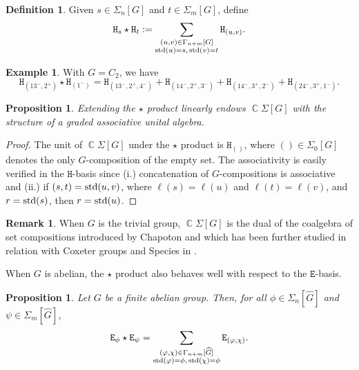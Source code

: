 \documentclass[11pt, oneside, reqno]{amsart}
\newtheorem{prop}[theorem]{Proposition}
\theoremstyle{definition}
\newtheorem{definition}[theorem]{Definition}
\newtheorem{example}[theorem]{Example}
\newtheorem{remark}[theorem]{Remark}
\numberwithin{equation}{section}
\DeclareMathOperator{\C}{\mathbb{C}}
\def \kk{\C}
\def \wh{\widehat}
\def \ztwo {{C_2}}
\newcommand{\B}[1]{\mathtt{#1}} 			%
\begin{document}
\begin{definition}\label{def:staronhsiao}
    Given $s \in \Sigma_n[G]$ and $t \in \Sigma_m[G]$, define
    \[
	\B{H}_s \star \B{H}_t := \sum_{ \substack{ (u,v) \in \Gamma_{n+m}[G] \\ {\rm std}(u)=s,\, {\rm std}(v)=t } } \B{H}_{(u,v)}.
    \]
\end{definition}

\begin{example}
    With $G = \ztwo$, we have
    \[		
        \B{H}_{({13}^-,2^+)} \star \B{H}_{(1^-)} = \B{H}_{(13^-,2^+,4^-)} + \B{H}_{(14^-,2^+,3^-)} + \B{H}_{(14^-,3^+,2^-)} + \B{H}_{(24^-,3^+,1^-)}.
    \]
\end{example}

\begin{prop}
    Extending the $\star$ product linearly endows $\kk \Sigma[G]$ with the structure of a graded associative unital algebra.
\end{prop}

\begin{proof}
    The unit of $\kk \Sigma[G]$ under the $\star$ product is $\B{H}_{()}$, where $() \in \Sigma_0[G]$ denotes the only $G$-composition of the empty set.
    The associativity is easily verified in the $\B{H}$-basis since (i.) concatenation of $G$-compositions is associative and (ii.) if $(s,t) = {\rm std}(u,v)$, where $\ell(s) = \ell(u)$ and $\ell(t) = \ell(v)$, and $r = {\rm std}(s)$, then $r = {\rm std}(u)$.
\end{proof}

\begin{remark}
    When $G$ is the trivial group, $\kk\Sigma[G]$ is the dual of the coalgebra of set compositions introduced by Chapoton \cite{Chapoton00} and which has been further studied in relation with Coxeter groups and Species in \cite{am06,am10}.
\end{remark}

When $G$ is abelian, the $\star$ product also behaves well with respect to the $\B{E}$-basis.

\begin{prop}
    Let $G$ be a finite abelian group. Then, for all $\phi \in \Sigma_n[\wh{G}]$ and $\psi \in \Sigma_m[\wh{G}]$,
    \begin{equation}\label{eq:star-E-basis}
        \B{E}_{\phi} \star \B{E}_{\psi} = \sum_{ \substack{ (\varphi,\chi) \in \Gamma_{n+m}[\wh{G}] \\ {\rm std}(\varphi)=\phi,\, {\rm std}(\chi)=\phi } } 
	\B{E}_{(\varphi,\chi)}.
    \end{equation}
\end{prop}
\end{document}
